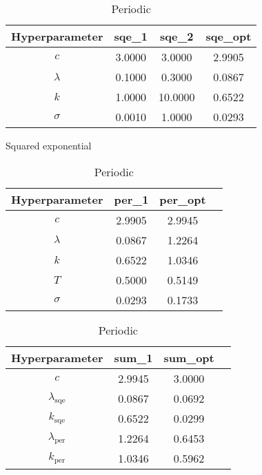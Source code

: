 \begin{table}
    \centering
    \begin{subtable}[t]{0.45\textwidth}
        \centering
        \begin{tabular}[t]{|c|c|c|c|}
            \hline
            Hyperparameter & sqe\_1 & sqe\_2 & sqe\_opt \\
            \hline
            $c$ & 3.0000 & 3.0000 & 2.9905 \\
            $\lambda$ & 0.1000 & 0.3000 & 0.0867 \\
            $k$ & 1.0000 & 10.0000 & 0.6522 \\
            $\sigma$ & 0.0010 & 1.0000 & 0.0293 \\
            \hline
        \end{tabular}
        \caption{Squared exponential}
        \label{table:sqe hyperparameters}
    \end{subtable}
    \begin{subtable}[t]{0.45\textwidth}
        \centering
        \begin{tabular}[t]{|c|c|c|c|}
            \hline
            Hyperparameter & per\_1 & per\_opt \\
            \hline
            $c$ & 2.9905 & 2.9945 \\
            $\lambda$ & 0.0867 & 1.2264 \\
            $k$ & 0.6522 & 1.0346 \\
            $T$ & 0.5000 & 0.5149 \\
            $\sigma$ & 0.0293 & 0.1733 \\
            \hline
        \end{tabular}
        \caption{Periodic}
        \label{table:per hyperparameters}
    \end{subtable}
    \newline
    \begin{subtable}[t]{0.45\textwidth}
        \centering
        \begin{tabular}[t]{|c|c|c|c|}
            \hline
            Hyperparameter & sum\_1 & sum\_opt \\
            \hline
            $c$ & 2.9945 & 3.0000 \\
            $\lambda_{\text{sqe}}$ & 0.0867 & 0.0692 \\
            $k_{\text{sqe}}$ & 0.6522 & 0.0299 \\
            $\lambda_{\text{per}}$ & 1.2264 & 0.6453 \\
            $k_{\text{per}}$ & 1.0346 & 0.5962 \\

\end{tabular}
\end{subtable}
\end{table}
